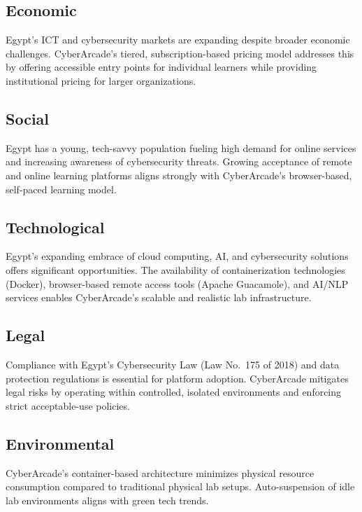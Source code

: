 \documentclass[12pt,a4paper]{report}
\begin{document}
\subsection{Economic}

Egypt's ICT and cybersecurity markets are expanding despite broader economic challenges. CyberArcade's
tiered, subscription-based pricing model addresses this by offering accessible entry points for
individual learners while providing institutional pricing for larger organizations.

\subsection{Social}

Egypt has a young, tech-savvy population fueling high demand for online services and increasing
awareness of cybersecurity threats. Growing acceptance of remote and online learning platforms aligns
strongly with CyberArcade's browser-based, self-paced learning model.

\subsection{Technological}

Egypt's expanding embrace of cloud computing, AI, and cybersecurity solutions offers significant
opportunities. The availability of containerization technologies (Docker), browser-based remote access
tools (Apache Guacamole), and AI/NLP services enables CyberArcade's scalable and realistic lab
infrastructure.

\subsection{Legal}

Compliance with Egypt's Cybersecurity Law (Law No.\ 175 of 2018) and data protection regulations is
essential for platform adoption. CyberArcade mitigates legal risks by operating within controlled,
isolated environments and enforcing strict acceptable-use policies.

\subsection{Environmental}

CyberArcade's container-based architecture minimizes physical resource consumption compared to
traditional physical lab setups. Auto-suspension of idle lab environments aligns with green tech
trends.
\end{document}
